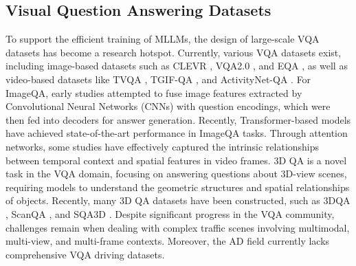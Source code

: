 \subsection{Visual Question Answering Datasets}

To support the efficient training of MLLMs, the design of large-scale VQA datasets has become a research hotspot. Currently, various VQA datasets exist, including image-based datasets such as CLEVR \cite{johnson2017clevr}, VQA2.0 \cite{goyal2017making}, and EQA \cite{das2018embodied}, as well as video-based datasets like TVQA \cite{lei2018tvqa}, TGIF-QA \cite{jang2017tgif}, and ActivityNet-QA \cite{yu2019activitynet}. For ImageQA, early studies \cite{johnson2017clevr,fukui2016multimodal} attempted to fuse image features extracted by Convolutional Neural Networks (CNNs) with question encodings, which were then fed into decoders for answer generation. Recently, Transformer-based models \cite{tan2019lxmert,zhang2021vinvl} have achieved state-of-the-art performance in ImageQA tasks. Through attention networks, some studies have effectively captured the intrinsic relationships between temporal context and spatial features in video frames. 3D QA is a novel task in the VQA domain, focusing on answering questions about 3D-view scenes, requiring models to understand the geometric structures and spatial relationships of objects. Recently, many 3D QA datasets have been constructed, such as 3DQA \cite{ye2022visatlas}, ScanQA \cite{azuma2022scanqa}, and SQA3D \cite{ma2022sqa3d}. Despite significant progress in the VQA community, challenges remain when dealing with complex traffic scenes involving multimodal, multi-view, and multi-frame contexts. Moreover, the AD field currently lacks comprehensive VQA driving datasets.